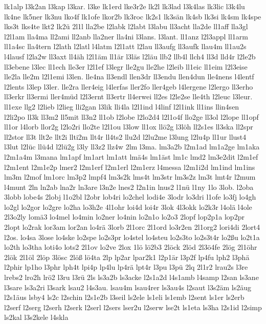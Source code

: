 {lk1alp
l3k2an
l3kap
l3kar.
l3ke
lk1erd
lke3r2e
lk2l
lk3lad
l3k4las
lk3lic
l3k4lu
lk4ne
lk5ner
lk3nu
lko4f
lk1ofe
lkor2b
lk3roc
lk2s1
lk3sän
lk4sb
lk3si
lk4sm
lk4spe
lks3t
lks4te
lkt2
lk2ü
2l1l
lla2be
l2labk
l2labt
l3labu
ll3acht
lla2de
ll1aff
lla3gl
l2l1am
lla4ma
ll2ami
ll2anb
lla2ner
lla4ni
l3lans.
l3lant.
ll1anz
l2l3appl
ll1arm
ll1a4sc
lla4tern
l2lath
l2latl
l4latm
l2l1att
l2lau
ll3aufg
ll3aufk
llau4m
ll1au2s
l4lausf
l2la2w
ll3axt
ll4äh
l2l1äm
ll1är
l3läs
l2läu
llb2
llb4l
llch4
ll3d
lld4r
l2le2b
ll3ebene
l3lec
ll1ech
lle3er
l2l1ef
l3legr
lle2gu
lle2he
l2leib
ll1eic
ll1eim
l2l3eise
lle2la
lle2m
l2l1emi
l3len.
lle4na
ll3endl
llen3dr
ll3endu
llen4dun
lle4nens
l4lentf
l2lents
l3lep
l3ler.
lle2ra
ller4eig
l4lerfas
ller2fo
ller4geb
l4lergene
l2lergo
ll3erho
ll3erkr
ll3ermi
ller4müd
l2l3ernt
ll3ertr
ll4erwei
ll2es
l2le2se
lle4th
l2leuc
l3leur.
ll1exe
llg2
l2lieb
l2lieg
lli2gan
l3lik
lli4la
l2l1ind
l4linf
l2l1ink
ll1ins
llin4sen
l2li2po
ll3k
ll3m2
ll5mit
ll3n2
ll1ob
l2lobe
l2lo2d4
l2l1o4f
llo2ge
ll3ol
l2lope
ll1opf
ll1or
l4lorb
llor2g
l2lo2ri
llo2te
l2l1ou
l3low
ll1ox
llö2g
l3löh
ll2s1es
ll3ska
ll2spr
ll2stor
ll3t
llt2e
llt2i
llti2m
llt4r
ll4ts2
llu2d
l2lu2me
l3lung
l2lu4p
ll1ur
llust4
l3lut
l2lüc
llü4d
l2lü2g
l3ly
ll3z2
llz4w
2lm
l3ma.
lm3a2b
l2m1ad
lm1a2ge
lm1aka
l2m1a4m
l3mana
lm1apf
lm1art
lm1att
lmä4s
lm1äst
lm1c
lmd2
lm3e2dit
l2m1ef
l2m1ent
l2m1e2p
lmer2
l2m1erf
l2m1erl
l2m1erz
l4messa
l2m1i2d
lm1ind
lm1ins
lm3m
l2mof
lm1orc
lm3p2
lmpf4
lm3s2k
lms4t
lm3str
lm3s2z
lm3t
lmt4r
l2mum
l4munt
2ln
ln2ab
lna2r
ln3are
l3n2e
lnes2
l2n1in
lnus2
l1nü
l1ny
1lo
3lob.
l2oba
3lobb
lobe4s
2lobj
l1o2bl
l2obr
lob4ri
lo2chel
lodi4e
3lodr
lo3dri
l1ofe
lo3fj
lo4gh
lo2gl
lo2gor
lo2gre
lo2ha
lo3h2e
4l1ohr
loi4d
loi4r
3lok
4l3okk
lo2k3r
l4olä
l4ole
2l3o2ly
lomä3
lo4mel
lo4min
lo2ner
lo4nin
lo2n1o
lo2o3
2lopf
lop2p1a
lop2pr
2lopt
lo2rak
lor3am
lor2an
lo4rä
3lorb
2l1orc
2l1ord
lo3r2en
2l1org2
lori4di
2lort4
l2os.
lo4sa
3lose
lo4ske
lo2spe
lo2s3pr
lo4stel
lo4steu
lo2s3to
lo2s3t4r
lo2ßu
lo2t1a
lo2th
lo3tha
loti4o
lots2
2l1ov
lo2ve
2lox
1lö
lö2b3
2löck
2löd
2l3ö4fe
2lög
2l1öhr
2lök
2l1öl
2löp
3lösc
2löß
lö4ta
2lp
lp2ar
lpar2k1
l2p1är
l3p2f
lp4fu
lph2
l3phä
l2phir
lp1ho
l3phr
lph4t
lpi4p
lp4lu
lp4rä
lpt4r
l3pu
l3pü
2lq
2l1r2
lrau2s
l3re
lrebs2
lro2h
lrö2
l3ru
l3rü
2ls
ls3a2b
ls3acke
l2s1a2d
l4s1amb
l4samp
l2san
ls3ane
l3sare
ls3a2ri
l3sark
lsau2
l4s3au.
lsau4m
lsau4rer
ls3au4s
l2saut
l3s2äm
ls2äug
l2s1äus
lsby4
ls2c
l2schin
l2s1e2b
l3seil
ls2ele
ls1eli
ls1emb
l2sent
ls1er
ls2erb
l2serf
l2serg
l2serh
l2serk
l2serl
l2sers
lser2u
l2serw
lse2t
ls1eta
ls3ha
l2s1id
l2simp
ls2kal
l3s2kele
l4skla
}

